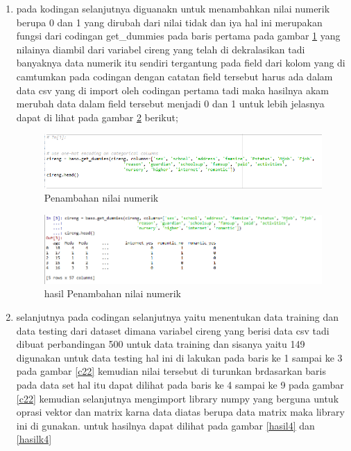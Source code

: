 \begin{enumerate}
\item pada kodingan selanjutnya diguanakn untuk menambahkan nilai numerik berupa 0 dan 1 yang dirubah dari nilai tidak dan iya hal ini merupakan fungsi dari codingan get\_dummies pada baris pertama pada gambar \ref{c21} yang nilainya diambil dari variabel cireng yang telah di dekralasikan tadi banyaknya data numerik itu sendiri tergantung pada field dari kolom yang di camtumkan pada codingan dengan catatan field tersebut harus ada dalam data csv yang di import oleh codingan pertama tadi maka hasilnya akam merubah data dalam field tersebut menjadi 0 dan 1 untuk lebih jelasnya dapat di lihat pada gambar \ref{hasil3} berikut; 

\begin{figure}[ht]
      \centerline{\includegraphics[width=1\textwidth]
      {figures/cokro/c21}}
      \caption{Penambahan nilai numerik}
      \label{c21}
      \end{figure}

\begin{figure}[ht]
      \centerline{\includegraphics[width=1\textwidth]
      {figures/cokro/hasil3}}
      \caption{hasil Penambahan nilai numerik}
      \label{hasil3}
      \end{figure}

\item selanjutnya pada codingan selanjutnya yaitu menentukan data training dan data testing dari dataset dimana variabel cireng yang berisi data csv tadi dibuat perbandingan 500 untuk data training dan sisanya yaitu 149 digunakan untuk data testing hal ini di lakukan pada baris ke 1 sampai ke 3 pada gambar \ref{c22} kemudian nilai tersebut di turunkan  brdasarkan baris pada data set hal itu dapat dilihat pada baris ke 4 sampai ke 9 pada gambar \ref{c22} kemudian selanjutnya mengimport library numpy yang berguna untuk oprasi vektor dan matrix karna data diatas berupa data matrix maka library ini di gunakan. untuk hasilnya dapat dilihat pada gambar \ref{hasil4} dan \ref{hasilk4}


\end{enumerate}
